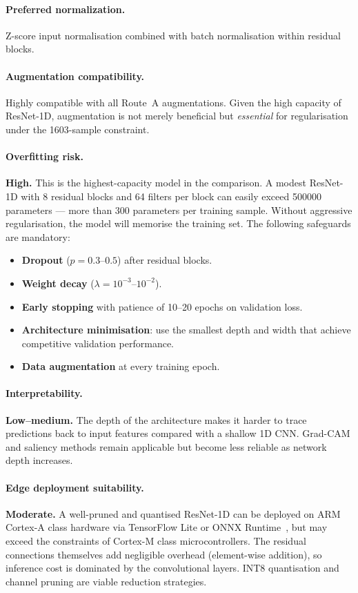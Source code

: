 \paragraph{Preferred normalization.}
Z-score input normalisation combined with batch normalisation within
residual blocks.

\paragraph{Augmentation compatibility.}
Highly compatible with all Route~A augmentations.  Given the high
capacity of ResNet-1D, augmentation is not merely beneficial but
\emph{essential} for regularisation under the \num{1603}-sample
constraint.

\paragraph{Overfitting risk.}
\textbf{High.}  This is the highest-capacity model in the comparison.
A modest ResNet-1D with 8 residual blocks and 64 filters per block
can easily exceed \num{500000} parameters --- more than 300 parameters
per training sample.  Without aggressive regularisation, the model
will memorise the training set.  The following safeguards are mandatory:
%
\begin{itemize}
  \item \textbf{Dropout} ($p = 0.3$--$0.5$) after residual blocks.
  \item \textbf{Weight decay} ($\lambda = 10^{-3}$--$10^{-2}$).
  \item \textbf{Early stopping} with patience of 10--20 epochs on
        validation loss.
  \item \textbf{Architecture minimisation}: use the smallest depth
        and width that achieve competitive validation performance.
  \item \textbf{Data augmentation} at every training epoch.
\end{itemize}

\paragraph{Interpretability.}
\textbf{Low--medium.}  The depth of the architecture makes it harder
to trace predictions back to input features compared with a shallow
1D CNN.  Grad-CAM and saliency methods remain applicable but become
less reliable as network depth increases.

\paragraph{Edge deployment suitability.}
\textbf{Moderate.}  A well-pruned and quantised ResNet-1D can be
deployed on ARM Cortex-A class hardware via TensorFlow Lite or ONNX
Runtime~\cite{tensorflow_lite, onnx_runtime}, but may exceed the
constraints of Cortex-M class microcontrollers.  The residual
connections themselves add negligible overhead (element-wise addition),
so inference cost is dominated by the convolutional layers.  INT8
quantisation and channel pruning are viable reduction strategies.

